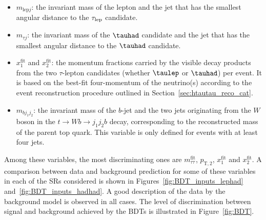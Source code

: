 \begin{itemize}
\item $m_{\text{lep}j}$: the invariant mass of the lepton and the jet that has the smallest angular distance to the $\tau_{\mathrm{lep}}$ candidate.
\item $m_{\tau j}$: the invariant mass of the  $\tauhad$ candidate and the jet that has the smallest angular distance to the $\tauhad$ candidate.
\item $x_{1}^{\text{fit}}$ and $x_{2}^{\text{fit}}$: the momentum fractions carried by the visible decay products from the two $\tau$-lepton candidates 
(whether $\taulep$ or $\tauhad$) per event. It is based on the best-fit four-momentum of the neutrino(s) according to the event reconstruction procedure outlined in Section~\ref{sec:htautau_reco_cat}.
\item $m_{bj_1j_2}$: the invariant mass of the $b$-jet and the two jets originating from the $W$ boson in the $t\to Wb \to j_1j_2b$ decay, corresponding to the reconstructed mass of the parent top quark. This variable is only defined for events with at least four jets.
\end{itemize}

Among these variables, the most discriminating ones are $m_{\tau\tau}^{\text{fit}}$, $p_{\text{T},2}$, $x_{1}^{\text{fit}}$ and $x_{2}^{\text{fit}}$. A comparison between data and background prediction for some of these variables in each of the SRs considered is shown in Figures~\ref{fig:BDT_inputs_lephad} and~\ref{fig:BDT_inputs_hadhad}.
A good description of the data by the background model is observed in all cases.
The level of discrimination between signal and background achieved by the BDTs is illustrated in Figure~\ref{fig:BDT}.


